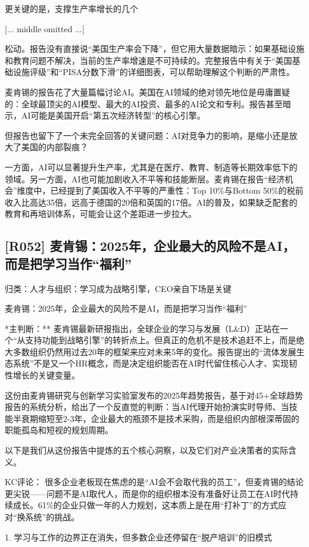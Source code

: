 \documentclass[11pt]{ctexart}
\begin{document}
更关键的是，支撑生产率增长的几个

[... middle omitted ...]

松动。报告没有直接说“美国生产率会下降”，但它用大量数据暗示：如果基础设施和教育问题不解决，当前的生产率增速是不可持续的。完整报告中有关于“美国基础设施评级”和“PISA分数下滑”的详细图表，可以帮助理解这个判断的严肃性。

麦肯锡的报告花了大量篇幅讨论AI。美国在AI领域的绝对领先地位是毋庸置疑的：全球最顶尖的AI模型、最大的AI投资、最多的AI论文和专利。报告甚至暗示，AI可能是美国开启“第五次经济转型”的核心引擎。

但报告也留下了一个未完全回答的关键问题：AI对竞争力的影响，是缩小还是放大了美国的内部裂痕？

一方面，AI可以显著提升生产率，尤其是在医疗、教育、制造等长期效率低下的领域。另一方面，AI也可能加剧收入不平等和技能断层。麦肯锡在报告“经济机会”维度中，已经提到了美国收入不平等的严重性：Top 10\%与Bottom 50\%的税前收入比高达35倍，远高于德国的20倍和英国的17倍。AI的普及，如果缺乏配套的教育和再培训体系，可能会让这个差距进一步拉大。

\subsection{[R052] 麦肯锡：2025年，企业最大的风险不是AI，而是把学习当作“福利”}
{\small\color{refgray}归类：人才与组织：学习成为战略引擎，CEO亲自下场是关键}

麦肯锡：2025年，企业最大的风险不是AI，而是把学习当作“福利”

*主判断：** 麦肯锡最新研报指出，全球企业的学习与发展（L\&D）正站在一个“从支持功能到战略引擎”的转折点上。但真正的危机不是技术追赶不上，而是绝大多数组织仍然用过去20年的框架来应对未来5年的变化。报告提出的“流体发展生态系统”不是又一个HR概念，而是决定组织能否在AI时代留住核心人才、实现韧性增长的关键变量。

这份由麦肯锡研究与创新学习实验室发布的2025年趋势报告，基于对45+全球趋势报告的系统分析，给出了一个反直觉的判断：当AI代理开始扮演实时导师、当技能半衰期缩短至2-3年，企业最大的瓶颈不是技术采购，而是组织内部根深蒂固的职能孤岛和短视的规划周期。

以下是我们从这份报告中提炼的五个核心洞察，以及它们对产业决策者的实际含义。

KC评论： 很多企业老板现在焦虑的是“AI会不会取代我的员工”，但麦肯锡的结论更尖锐——问题不是AI取代人，而是你的组织根本没有准备好让员工在AI时代持续成长。61\%的企业只做一年的人力规划，这本质上是在用“打补丁”的方式应对“换系统”的挑战。

1. 学习与工作的边界正在消失，但多数企业还停留在“脱产培训”的旧模式
\end{document}
